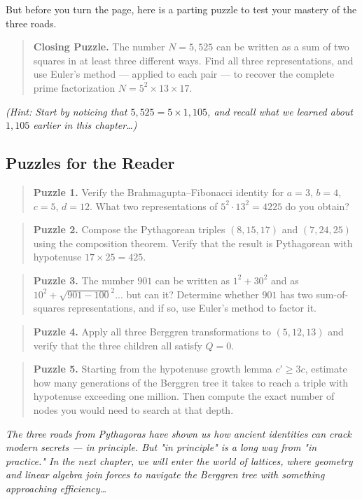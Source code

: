 \documentclass[11pt,twoside,openright]{book}
\theoremstyle{definition}
\theoremstyle{remark}
\begin{document}
But before you turn the page, here is a parting puzzle to test your mastery of the three roads.

\begin{quote}
\textbf{Closing Puzzle.} The number $N = 5{,}525$ can be written as a sum of two squares in at least three different ways. Find all three representations, and use Euler's method --- applied to each pair --- to recover the complete prime factorization $N = 5^2 \times 13 \times 17$.
\end{quote}
\textit{(Hint: Start by noticing that $5{,}525 = 5 \times 1{,}105$, and recall what we learned about $1{,}105$ earlier in this chapter\ldots{})}


\subsection{Puzzles for the Reader}

\begin{quote}
\textbf{Puzzle 1.} Verify the Brahmagupta--Fibonacci identity for $a = 3$, $b = 4$, $c = 5$, $d = 12$. What two representations of $5^2 \cdot 13^2 = 4225$ do you obtain?
\end{quote}
\begin{quote}
\textbf{Puzzle 2.} Compose the Pythagorean triples $(8, 15, 17)$ and $(7, 24, 25)$ using the composition theorem. Verify that the result is Pythagorean with hypotenuse $17 \times 25 = 425$.
\end{quote}
\begin{quote}
\textbf{Puzzle 3.} The number $901$ can be written as $1^2 + 30^2$ and as $10^2 + \sqrt{901 - 100}^2$... but can it? Determine whether $901$ has two sum-of-squares representations, and if so, use Euler's method to factor it.
\end{quote}
\begin{quote}
\textbf{Puzzle 4.} Apply all three Berggren transformations to $(5, 12, 13)$ and verify that the three children all satisfy $Q = 0$.
\end{quote}
\begin{quote}
\textbf{Puzzle 5.} Starting from the hypotenuse growth lemma $c' \geq 3c$, estimate how many generations of the Berggren tree it takes to reach a triple with hypotenuse exceeding one million. Then compute the exact number of nodes you would need to search at that depth.
\end{quote}

\textit{The three roads from Pythagoras have shown us how ancient identities can crack modern secrets --- in principle. But "in principle" is a long way from "in practice." In the next chapter, we will enter the world of lattices, where geometry and linear algebra join forces to navigate the Berggren tree with something approaching efficiency\ldots{}}
\end{document}
